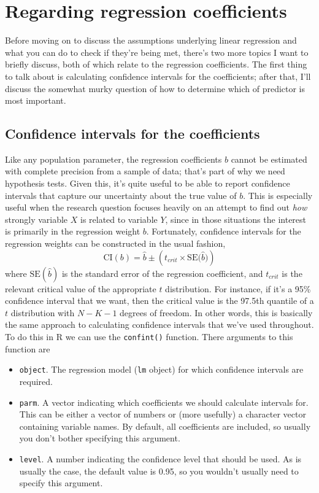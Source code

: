 \documentclass[
]{book}
\providecommand{\tightlist}{%
  \setlength{\itemsep}{0pt}\setlength{\parskip}{0pt}}
\begin{document}
\hypertarget{regressioncoefs}{%
\section{Regarding regression coefficients}\label{regressioncoefs}}

Before moving on to discuss the assumptions underlying linear regression and what you can do to check if they're being met, there's two more topics I want to briefly discuss, both of which relate to the regression coefficients. The first thing to talk about is calculating confidence intervals for the coefficients; after that, I'll discuss the somewhat murky question of how to determine which of predictor is most important.

\hypertarget{confidence-intervals-for-the-coefficients}{%
\subsection{Confidence intervals for the coefficients}\label{confidence-intervals-for-the-coefficients}}

Like any population parameter, the regression coefficients \(b\) cannot be estimated with complete precision from a sample of data; that's part of why we need hypothesis tests. Given this, it's quite useful to be able to report confidence intervals that capture our uncertainty about the true value of \(b\). This is especially useful when the research question focuses heavily on an attempt to find out \emph{how} strongly variable \(X\) is related to variable \(Y\), since in those situations the interest is primarily in the regression weight \(b\). Fortunately, confidence intervals for the regression weights can be constructed in the usual fashion,
\[
\mbox{CI}(b) = \hat{b} \pm \left( t_{crit} \times \mbox{SE}({\hat{b})}  \right)
\]
where \(\mbox{SE}({\hat{b}})\) is the standard error of the regression coefficient, and \(t_{crit}\) is the relevant critical value of the appropriate \(t\) distribution. For instance, if it's a 95\% confidence interval that we want, then the critical value is the 97.5th quantile of a \(t\) distribution with \(N-K-1\) degrees of freedom. In other words, this is basically the same approach to calculating confidence intervals that we've used throughout. To do this in R we can use the \texttt{confint()} function. There arguments to this function are

\begin{itemize}
\tightlist
\item
  \texttt{object}. The regression model (\texttt{lm} object) for which confidence intervals are required.
\item
  \texttt{parm}. A vector indicating which coefficients we should calculate intervals for. This can be either a vector of numbers or (more usefully) a character vector containing variable names. By default, all coefficients are included, so usually you don't bother specifying this argument.
\item
  \texttt{level}. A number indicating the confidence level that should be used. As is usually the case, the default value is 0.95, so you wouldn't usually need to specify this argument.
\end{itemize}
\end{document}
